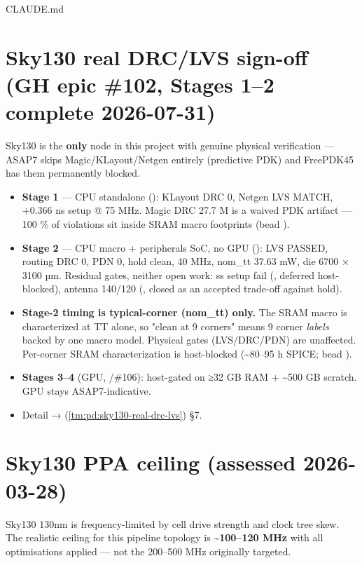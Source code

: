 \begin{relocated}{CLAUDE.md}
\section{Sky130 real DRC/LVS sign-off (GH epic \#102, Stages 1--2
complete 2026-07-31)}\label{tm:pd:node-strategy:sky130-real-drclvs-sign-off-gh-epic-102-stages-12-complete-2026-07-31}

Sky130 is the \textbf{only} node in this project with genuine physical
verification --- ASAP7 skips
Magic/\allowbreak{}KLayout/\allowbreak{}Netgen entirely (predictive PDK)
and FreePDK45 has them permanently blocked.

\begin{itemize}
\tightlist
\item
  \textbf{Stage 1} --- CPU standalone (): KLayout
  DRC 0, Netgen LVS MATCH, +0.366 ns setup @ 75 MHz. Magic DRC 27.7 M is
  a waived PDK artifact --- 100 \% of violations sit inside SRAM macro
  footprints (bead ).
\item
  \textbf{Stage 2} --- CPU macro + peripherals SoC, no GPU
  (): LVS PASSED, routing DRC 0, PDN 0, hold clean,
  40 MHz, nom\_tt 37.63 mW, die 6700 × 3100 µm. Residual gates, neither
  open work: ss setup fail (, deferred host-blocked), antenna
  140/120 (, closed as an accepted trade-off against hold).
\item
  \warn{} \textbf{Stage-2 timing is typical-corner (nom\_tt) only.} The
  SRAM macro is characterized at TT alone, so "clean at 9 corners" means
  9 corner \emph{labels} backed by one macro model. Physical gates
  (LVS/\allowbreak{}DRC/\allowbreak{}PDN) are unaffected. Per-corner
  SRAM characterization is host-blocked (\textasciitilde80--95 h SPICE;
  bead ).
\item
  \textbf{Stages 3--4} (GPU, /\allowbreak{}\#106): host-gated on
  ≥32 GB RAM + \textasciitilde500 GB scratch. GPU stays
  ASAP7-indicative.
\item
  Detail →  (\cref{tm:pd:sky130-real-drc-lvs}) §7.
\end{itemize}

\section{Sky130 PPA ceiling (assessed 2026-03-28)}\label{tm:pd:node-strategy:sky130-ppa-ceiling-assessed-2026-03-28}

Sky130 130nm is frequency-limited by cell drive strength and clock tree
skew. The realistic ceiling for this pipeline topology is
\textbf{\textasciitilde100--120 MHz} with all optimisations applied ---
not the 200--500 MHz originally targeted.


\end{relocated}
